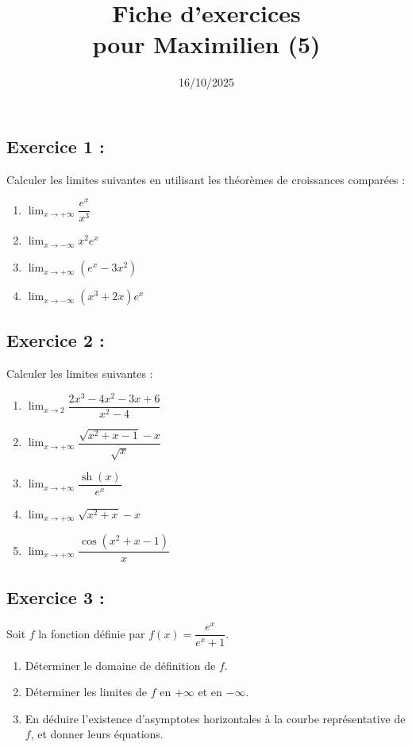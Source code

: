 \documentclass[12pt,a4paper]{article}
\title{Fiche d'exercices \\ pour Maximilien (5)}
\date{16/10/2025}
\author{}
\begin{document}
\maketitle

\subsection*{Exercice 1 :}

Calculer les limites suivantes en utilisant les théorèmes de croissances comparées :
\begin{enumerate}
\item  $\displaystyle\lim_{x\to +\infty}\dfrac{e^x}{x^3}$
\item $\displaystyle\lim_{x\to -\infty} x^2 e^x$
\item  $\displaystyle\lim_{x\to +\infty}(e^x - 3x^2)$
\item $\displaystyle\lim_{x\to -\infty}(x^3 + 2x)e^x$

\end{enumerate}

\subsection*{Exercice 2 :}
Calculer les limites suivantes :
\begin{enumerate}
    \item $\displaystyle\lim_{x\to 2}\dfrac{2x^3-4x^2-3x+6}{x^2-4}$
    \item $\displaystyle\lim_{x\to +\infty}\dfrac{\sqrt{x^2+x-1}-x}{\sqrt{x}}$
    \item $\displaystyle\lim_{x\to +\infty}\dfrac{\operatorname{sh}(x)}{e^x}$
    \item $\displaystyle\lim_{x\to +\infty}\sqrt{x^2+x}-x$
    \item $\displaystyle\lim_{x\to +\infty}\dfrac{\cos(x^2+x-1)}{x}$
\end{enumerate}

\subsection*{Exercice 3 :}
Soit $f$ la fonction définie par $f(x)=\dfrac{e^x}{e^x+1}$.
\begin{enumerate}
    \item Déterminer le domaine de définition de $f$.
    \item Déterminer les limites de $f$ en $+\infty$ et en $-\infty$.
    \item En déduire l'existence d'asymptotes horizontales à la courbe représentative de $f$, et donner leurs équations.
\end{enumerate}
\end{document}
